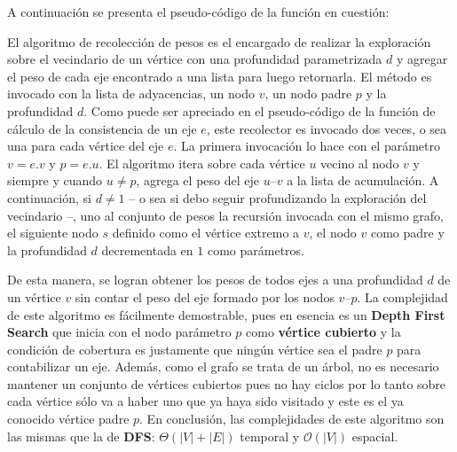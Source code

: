 A continuación se presenta el pseudo-código de la función en cuestión:


El algoritmo de recolección de pesos es el encargado de realizar la exploración sobre el vecindario de un vértice con una profundidad parametrizada $d$ y agregar el peso de cada eje encontrado a una lista para luego retornarla. El método es invocado con la lista de adyacencias, un nodo $v$, un nodo padre $p$ y la profundidad $d$. Como puede ser apreciado en el pseudo-código de la función de cálculo de la consistencia de un eje $e$, este recolector es invocado dos veces, o sea una para cada vértice del eje $e$. La primera invocación lo hace con el parámetro $v=e.v$ y $p=e.u$. El algoritmo itera sobre cada vértice $u$ vecino al nodo $v$ y siempre y cuando $u \neq p$, agrega el peso del eje $u–v$ a la lista de acumulación. A continuación, si $d \neq 1$ – o sea si debo seguir profundizando la exploración del vecindario –, uno al conjunto de pesos la recursión invocada con el mismo grafo, el siguiente nodo $s$ definido como el vértice extremo a $v$, el nodo $v$ como padre y la profundidad $d$ decrementada en $1$ como parámetros.

\vskip 8pt

De esta manera, se logran obtener los pesos de todos ejes a una profundidad $d$ de un vértice $v$ sin contar el peso del eje formado por los nodos $v–p$. La complejidad de este algoritmo es fácilmente demostrable, pues en esencia es un \textbf{Depth First Search} que inicia con el nodo parámetro $p$ como \textbf{vértice cubierto} y la condición de cobertura es justamente que ningún vértice sea el padre $p$ para contabilizar un eje. Además, como el grafo se trata de un árbol, no es necesario mantener un conjunto de vértices cubiertos pues no hay ciclos por lo tanto sobre cada vértice sólo va a haber uno que ya haya sido visitado y este es el ya conocido vértice padre $p$. En conclusión, las complejidades de este algoritmo son las mismas que la de \textbf{DFS}: $\Theta(|V| + |E|)$ temporal y $\mathcal{O}(|V|)$ espacial.



